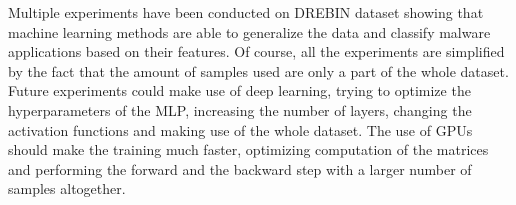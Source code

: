 \documentclass[paper=a4, fontsize=11pt]{scrartcl} %
\numberwithin{equation}{section} %
\numberwithin{figure}{section} %
\numberwithin{table}{section} %
\theoremstyle{definition}
\begin{document}
Multiple experiments have been conducted on DREBIN dataset showing that
machine learning methods are able to generalize the data and classify malware
applications based on their features. Of course, all the experiments are
simplified by the fact that the amount of samples used are only a part of the
whole dataset. Future experiments could make use of deep learning, trying to
optimize the hyperparameters of the MLP, increasing the number of layers,
changing the activation functions and making use of the whole dataset. The use
of GPUs should make the training much faster, optimizing computation of the matrices
and performing the forward and the backward step with a larger number of
samples altogether.


\newpage



\end{document}
